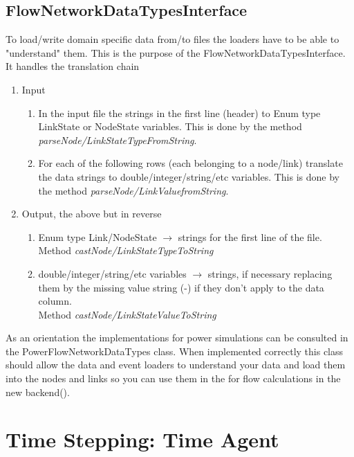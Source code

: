 \documentclass[11pt,fleqn]{book} %
\newcommand{\TimeAgent}{Time Agent}
\newcommand{\backend}[1][]{backend#1}
\newcommand{\domain}[1][]{domain#1}
\begin{document}
\subsection{FlowNetworkDataTypesInterface}
To load/write \domain{} specific data from/to files the loaders have to be able to "understand" them. This is the purpose of the FlowNetworkDataTypesInterface. It handles the translation chain 
\begin{enumerate}
	\item Input
	\begin{enumerate}
		\item In the input file the strings in the first line (header) to Enum type LinkState or NodeState variables. This is done by the method \textit{parseNode/LinkStateTypeFromString}.
		\item For each of the following rows (each belonging to a node/link) translate the data strings to double/integer/string/etc variables. This is done by the method \textit{parseNode/LinkValuefromString}.
	\end{enumerate}
	\item Output, the above but in reverse
	\begin{enumerate}
		\item Enum type Link/NodeState $\rightarrow$ strings for the first line of the file. \\ Method \textit{castNode/LinkStateTypeToString}
		\item double/integer/string/etc variables $\rightarrow$ strings, if necessary replacing them by the missing value string (-) if they don't apply to the data column. \\ Method \textit{castNode/LinkStateValueToString}
	\end{enumerate}
\end{enumerate}

As an orientation the implementations for power simulations can be consulted in the PowerFlowNetworkDataTypes class. When implemented correctly this class should allow the data and event loaders to understand your data and load them into the nodes and links so you can use them in the for flow calculations in the new \backend().

\section{Time Stepping: \TimeAgent }
\end{document}

